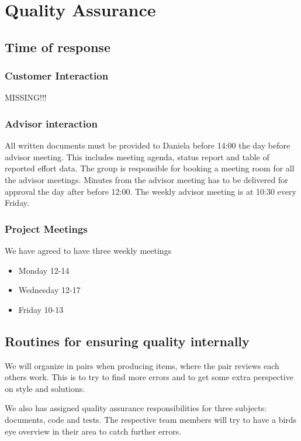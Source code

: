 \section{Quality Assurance}

\subsection{Time of response}

\subsubsection{Customer Interaction}
MISSING!!!

\subsubsection{Advisor interaction}
All written documents must be provided to Daniela before 14:00 the day before advisor meeting. This includes meeting agenda, status report and table of reported effort data. The group is responsible for booking a meeting room for all the advisor meetings. Minutes from the advisor meeting has to be delivered for approval the day after before 12:00. The weekly advisor meeting is at 10:30 every Friday. 

\subsubsection{Project Meetings}
We have agreed to have three weekly meetings
\begin{itemize}
	\item Monday 12-14
	\item Wednesday 12-17
	\item Friday 10-13
\end{itemize}

\subsection{Routines for ensuring quality internally}
We will organize in pairs when producing items, where the pair reviews each others work. This is to try to find more errors and to get some extra perspective on style and solutions.

We also has assigned quality assurance responsibilities for three subjects: documents, code and tests. The respective team members will try to have a birds eye overview in their area to catch further errors.

